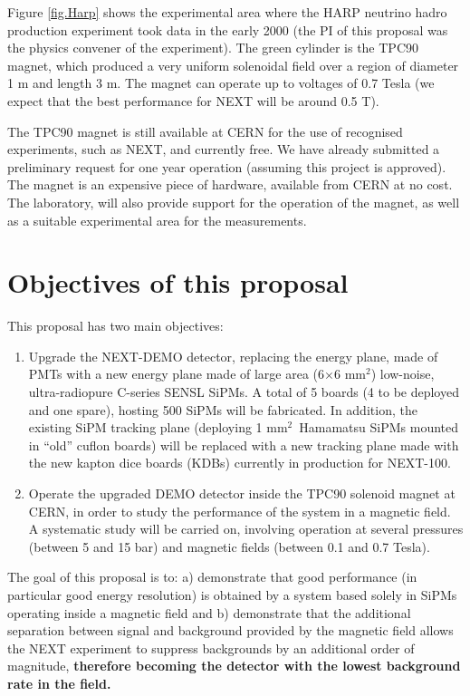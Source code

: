 Figure \ref{fig.Harp} shows the experimental area where the HARP neutrino hadro production  experiment took data in the early 2000 (the PI of this proposal was the physics convener of the experiment). The green cylinder is the TPC90 magnet, which produced a very uniform solenoidal field over a region of diameter 1 m and length 3 m. The magnet can operate up to voltages of 0.7 Tesla (we expect that the best performance for NEXT will be around 0.5 T). 

The TPC90 magnet is still available at CERN for the use of recognised experiments, such as NEXT, and currently free. We have already submitted a preliminary request for one year operation (assuming this project is approved). The magnet is an expensive piece of hardware, available from CERN at no cost. The laboratory, will also provide support for the operation of the magnet, as well as a suitable experimental area for the measurements. 

\section*{Objectives of this proposal}
This proposal has two main objectives: 
\begin{enumerate}
\item Upgrade the NEXT-DEMO detector, replacing the energy plane, made of PMTs with a new energy plane made of large area (6$\times$6 mm$^2$) low-noise, ultra-radiopure C-series SENSL SiPMs. A total of 5 boards (4 to be deployed and one spare), hosting 500 SiPMs will be fabricated. In addition, the existing SiPM tracking plane (deploying 1 mm$^2$~Hamamatsu SiPMs mounted in ``old'' cuflon boards) will be replaced with a new tracking plane made with the new kapton dice boards (KDBs) currently in production for NEXT-100. 
\item Operate the upgraded DEMO detector inside the TPC90 solenoid magnet at CERN, in order to study the performance of the system in a magnetic field. A systematic study will be carried on, involving operation at several pressures (between 5 and 15 bar) and magnetic fields (between 0.1 and 0.7 Tesla). 
\end{enumerate}

The goal of this proposal is to: a) demonstrate that good performance (in particular good energy resolution) is obtained by a system based solely in SiPMs operating inside a magnetic field and b) demonstrate that the additional separation between signal and background provided by the magnetic field allows the NEXT experiment to suppress backgrounds by an additional order of magnitude, {\bf therefore becoming the detector with the lowest background rate in the field.} 


